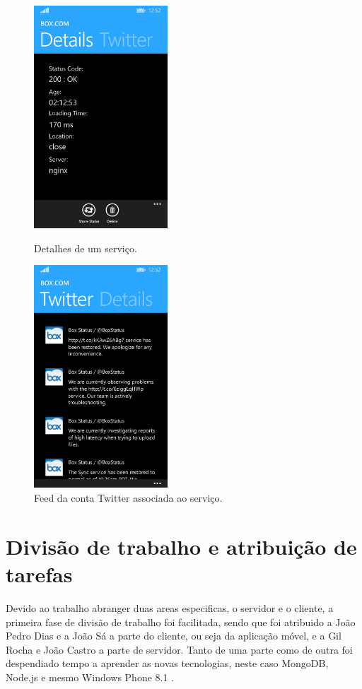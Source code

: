 \documentclass[12pt]{article}
\begin{document}
\begin{figure}[ht!]
\centering
\parbox{5cm}{
\includegraphics[width=5cm]{4.png}
\caption{Detalhes de um serviço.}
\label{fig:2figsA}}
\qquad
\begin{minipage}{5cm}
\includegraphics[width=5cm]{5.png}
\caption{Feed da conta Twitter associada ao serviço.}
\label{fig:2figsB}
\end{minipage}
\end{figure}
\section{Divisão de trabalho e atribuição de tarefas}

Devido ao trabalho abranger duas areas especificas, o servidor e o cliente, a primeira fase de divisão de trabalho foi facilitada, sendo que foi atribuido a João Pedro Dias e a João Sá a parte do cliente, ou seja da aplicação móvel, e a Gil Rocha e João Castro a parte de servidor.  Tanto de uma parte como de outra foi despendiado tempo a aprender as novas tecnologias, neste caso MongoDB, Node.js e mesmo Windows Phone 8.1 . 
\end{document}
